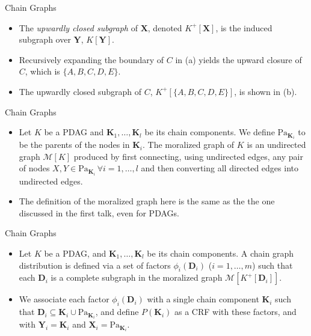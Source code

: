 \documentclass[11pt]{beamer}
\begin{document}
\begin{frame}{Chain Graphs}
\centering
\begin{figure}
\resizebox{0.6\textwidth}{!}{\upwardclosure}
\end{figure}
\begin{itemize}
	\item The \emph{upwardly closed subgraph} of $\boldsymbol{X}$, denoted
	$K^{+}[\boldsymbol{X}]$, is the induced subgraph over $\boldsymbol{Y}$,
	$K[\boldsymbol{Y}]$.
	\item Recursively expanding the boundary of $C$ in (a) yields the upward
	closure of $C$, which is $\{A,B,C,D,E\}$.
	\item The upwardly closed subgraph of $C$, $K^{+}[\{A,B,C,D,E\}]$, is
	shown in (b).
\end{itemize}
\end{frame}

\begin{frame}{Chain Graphs}
\begin{itemize}
	\item Let $K$ be a PDAG and $\boldsymbol{K}_{1}, \ldots,
	\boldsymbol{K}_{l}$ be its chain components. We define
	$\text{Pa}_{\boldsymbol{K}_{i}}$ to be the parents of the nodes in
	$\boldsymbol{K}_{i}$. The moralized graph of $K$ is an undirected graph
	$\mathcal{M}[K]$ produced by first connecting, using undirected edges,
	any pair of nodes $X,Y \in \text{Pa}_{\boldsymbol{K}_{i}} \,\forall i =
	1, \ldots, l$ and then converting all directed edges into undirected
	edges.
	\item The definition of the moralized graph here is the same as the the
	one discussed in the first talk, even for PDAGs.
\end{itemize}
\end{frame}

\begin{frame}{Chain Graphs}
\begin{itemize}
	\item Let $K$ be a PDAG, and $\boldsymbol{K}_{1}, \ldots,
	\boldsymbol{K}_{l}$ be its chain components. A chain graph distribution
	is defined via a set of factors $\phi_{i}(\boldsymbol{D}_{i})$ ($i = 1,
	\ldots, m$) such that each $\boldsymbol{D}_{i}$ is a complete subgraph
	in the moralized graph $\mathcal{M}[K^{+}[\boldsymbol{D}_{i}]]$.
	\item We associate each factor $\phi_{i}(\boldsymbol{D}_{i})$ with a
	single chain component $\boldsymbol{K}_{i}$ such that
	$\boldsymbol{D}_{i} \subseteq \boldsymbol{K}_{i} \cup
	\text{Pa}_{\boldsymbol{K}_{i}}$, and define $P(\boldsymbol{K}_{i})$ as a
	CRF with these factors, and with $\boldsymbol{Y}_{i} =
	\boldsymbol{K}_{i}$ and $\boldsymbol{X}_{i} =
	\text{Pa}_{\boldsymbol{K}_{i}}$.
\end{itemize}
\end{frame}
\end{document}
